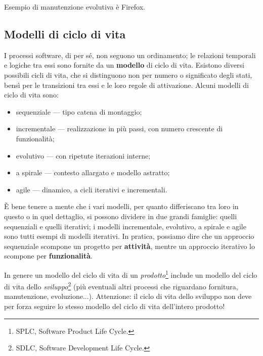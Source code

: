 \documentclass[a4paper]{article}
\begin{document}
		
Esempio di manutenzione evolutiva è Firefox.

		
	\subsection{Modelli di ciclo di vita}

		
I processi software, di per sé, non seguono un ordinamento; le relazioni temporali e logiche tra essi sono fornite da un \textbf{modello} di ciclo di vita. Esistono diversi possibili cicli di vita, che si distinguono non per numero o significato degli stati, bensì per le transizioni tra essi e le loro regole di attivazione. Alcuni modelli di ciclo di vita sono:
		
	\begin{itemize}
		
			
	\item sequenziale --- tipo catena di montaggio;
			
	\item incrementale --- realizzazione in più passi, con numero crescente di funzionalità;
			
	\item evolutivo --- con ripetute iterazioni interne;
			
	\item a spirale --- contesto allargato e modello astratto;
			
	\item agile --- dinamico, a cicli iterativi e incrementali.
		
	\end{itemize}

		
È bene tenere a mente che i vari modelli, per quanto differiscano tra loro in questo o in quel dettaglio, si possono dividere in due grandi famiglie: quelli sequenziali e quelli iterativi; i modelli incrementale, evolutivo, a spirale e agile sono tutti esempi di modelli iterativi. In pratica, possiamo dire che un approccio sequenziale scompone un progetto per \textbf{attività}, mentre un approccio iterativo lo scompone per \textbf{funzionalità}.
		
In genere un modello del ciclo di vita di un \emph{prodotto}\footnote{SPLC, Software Product Life Cycle.} include un modello del ciclo di vita dello \emph{sviluppo}\footnote{SDLC, Software Development Life Cycle.} (più eventuali altri processi che riguardano fornitura, manutenzione, evoluzione...). Attenzione: il ciclo di vita dello sviluppo non deve per forza seguire lo stesso modello del ciclo di vita dell'intero prodotto!
		
\end{document}
